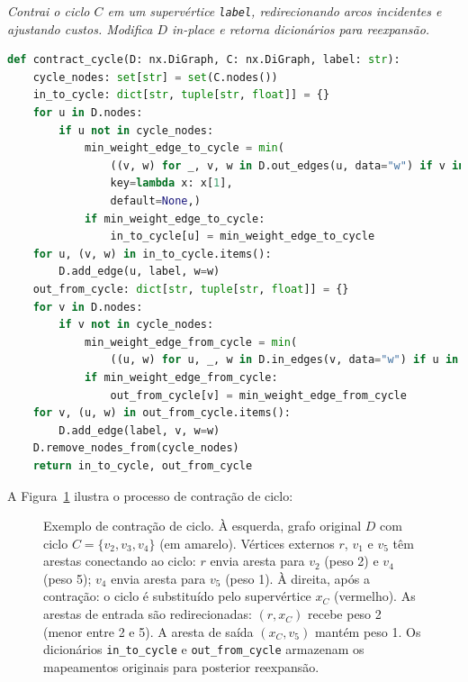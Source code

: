 \begin{tcolorbox}[
        enhanced, breakable,
        colframe=blue!60!black, colback=blue!2,
        colbacktitle=blue!15, coltitle=black,
        title={Contração de ciclo},
        boxed title style={sharp corners, boxrule=0.6pt},
        sharp corners, boxrule=0.6pt
    ]
    \emph{Contrai o ciclo $C$ em um supervértice \texttt{label}, redirecionando arcos incidentes e ajustando custos. Modifica $D$ in-place e retorna dicionários para reexpansão.}
    \tcblower
    \begin{lstlisting}[mathescape=true, language=Python]
def contract_cycle(D: nx.DiGraph, C: nx.DiGraph, label: str):
    cycle_nodes: set[str] = set(C.nodes())
    in_to_cycle: dict[str, tuple[str, float]] = {}
    for u in D.nodes:
        if u not in cycle_nodes:
            min_weight_edge_to_cycle = min(
                ((v, w) for _, v, w in D.out_edges(u, data="w") if v in cycle_nodes),
                key=lambda x: x[1],
                default=None,)
            if min_weight_edge_to_cycle:
                in_to_cycle[u] = min_weight_edge_to_cycle
    for u, (v, w) in in_to_cycle.items():
        D.add_edge(u, label, w=w)
    out_from_cycle: dict[str, tuple[str, float]] = {}
    for v in D.nodes:
        if v not in cycle_nodes:
            min_weight_edge_from_cycle = min(
                ((u, w) for u, _, w in D.in_edges(v, data="w") if u in cycle_nodes),key=lambda x: x[1], default=None,)
            if min_weight_edge_from_cycle:
                out_from_cycle[v] = min_weight_edge_from_cycle
    for v, (u, w) in out_from_cycle.items():
        D.add_edge(label, v, w=w)
    D.remove_nodes_from(cycle_nodes)
    return in_to_cycle, out_from_cycle  
\end{lstlisting}
\end{tcolorbox}

A Figura~\ref{fig:contract-cycle-example} ilustra o processo de contração de ciclo:

\begin{figure}[H]
    \centering
    
    \caption{Exemplo de contração de ciclo. À esquerda, grafo original \(D\) com ciclo \(C=\{v_2, v_3, v_4\}\) (em amarelo). Vértices externos \(r\), \(v_1\) e \(v_5\) têm arestas conectando ao ciclo: \(r\) envia aresta para \(v_2\) (peso 2) e \(v_4\) (peso 5); \(v_4\) envia aresta para \(v_5\) (peso 1). À direita, após a contração: o ciclo é substituído pelo supervértice \(x_C\) (vermelho). As arestas de entrada são redirecionadas: \((r, x_C)\) recebe peso 2 (menor entre 2 e 5). A aresta de saída \((x_C, v_5)\) mantém peso 1. Os dicionários \texttt{in\_to\_cycle} e \texttt{out\_from\_cycle} armazenam os mapeamentos originais para posterior reexpansão.}
    \label{fig:contract-cycle-example}
\end{figure}

